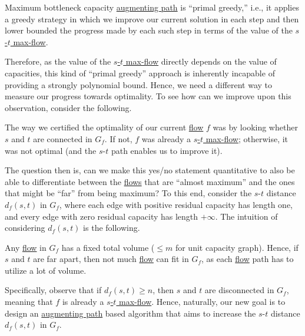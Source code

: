 \begin{prev}
	Maximum bottleneck capacity \hyperref[def:augmenting-path]{augmenting path} is ``primal greedy,'' i.e., it applies a greedy strategy in which we improve our current solution in each step and then lower bounded the progress made by each such step in terms of the value of the \hyperref[prb:s-t-max-flow]{\(s\)-\(t\) max-flow}.
\end{prev}

Therefore, as the value of the \hyperref[prb:s-t-max-flow]{\(s\)-\(t\) max-flow} directly depends on the value of capacities, this kind of ``primal greedy'' approach is inherently incapable of providing a strongly polynomial bound. Hence, we need a different way to measure our progress towards optimality. To see how can we improve upon this observation, consider the following.

\begin{prev}
	The way we certified the optimality of our current \hyperref[def:flow]{flow} \(f\) was by looking whether \(s\) and \(t\) are connected in \(G_f\). If not, \(f\) was already a \hyperref[prb:s-t-max-flow]{\(s\)-\(t\) max-flow}; otherwise, it was not optimal (and the \(s\)-\(t\) path enables us to improve it).
\end{prev}

The question then is, can we make this yes/no statement quantitative to also be able to differentiate between the \hyperref[def:flow]{flows} that are ``almost maximum'' and the ones that might be ``far'' from being maximum? To this end, consider the \(s\)-\(t\) distance \(d_f(s, t)\) in \(G_f\), where each edge with positive residual capacity has length one, and every edge with zero residual capacity has length \(+\infty \). The intuition of considering \(d_f(s, t)\) is the following.

\begin{intuition}
	Any \hyperref[def:flow]{flow} in \(G_f\) has a fixed total volume (\(\leq m\) for unit capacity graph). Hence, if \(s\) and \(t\) are far apart, then not much \hyperref[def:flow]{flow} can fit in \(G_f\), as each \hyperref[def:flow]{flow} path has to utilize a lot of volume.
\end{intuition}

Specifically, observe that if \(d_f(s, t) \geq n\), then \(s\) and \(t\) are disconnected in \(G_f\), meaning that \(f\) is already a \hyperref[prb:s-t-max-flow]{\(s\)-\(t\) max-flow}. Hence, naturally, our new goal is to design an \hyperref[def:augmenting-path]{augmenting path} based algorithm that aims to increase the \(s\)-\(t\) distance \(d_f(s, t)\) in \(G_f\).

